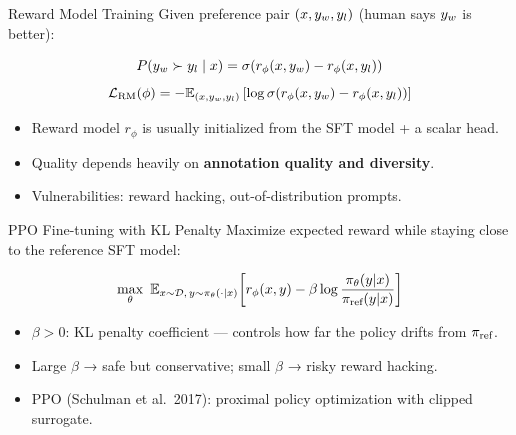 \documentclass[aspectratio=169,10pt]{beamer}
\begin{document}
\begin{frame}{Reward Model Training}
  Given preference pair $(x, y_w, y_l)$ (human says $y_w$ is better):
  \vspace{0.3em}
  \begin{tcolorbox}[hitbox, title=Bradley-Terry Model]
    \[
      P(y_w \succ y_l \mid x)
      = \sigma\!\left(r_\phi(x, y_w) - r_\phi(x, y_l)\right)
    \]
    \[
      \mathcal{L}_\text{RM}(\phi) = -\mathbb{E}_{(x,y_w,y_l)}\left[
        \log \sigma\!\left(r_\phi(x, y_w) - r_\phi(x, y_l)\right)
      \right]
    \]
  \end{tcolorbox}
  \vspace{0.3em}
  \begin{itemize}
    \item Reward model $r_\phi$ is usually initialized from the SFT model + a scalar head.
    \item Quality depends heavily on \textbf{annotation quality and diversity}.
    \item Vulnerabilities: reward hacking, out-of-distribution prompts.
  \end{itemize}
\end{frame}

\begin{frame}{PPO Fine-tuning with KL Penalty}
  Maximize expected reward while staying close to the reference SFT model:
  \begin{tcolorbox}[hitbox, title=RLHF Objective]
    \[
      \max_\theta\ \mathbb{E}_{x \sim \mathcal{D},\, y \sim \pi_\theta(\cdot|x)}\!\left[
        r_\phi(x, y) - \beta \log \frac{\pi_\theta(y|x)}{\pi_{\text{ref}}(y|x)}
      \right]
    \]
  \end{tcolorbox}
  \vspace{0.3em}
  \begin{itemize}
    \item $\beta > 0$: KL penalty coefficient — controls how far the policy drifts from $\pi_{\text{ref}}$.
    \item Large $\beta$ → safe but conservative; small $\beta$ → risky reward hacking.
    \item PPO (Schulman et al.\ 2017): proximal policy optimization with clipped surrogate.
  \end{itemize}
\end{frame}
\end{document}
